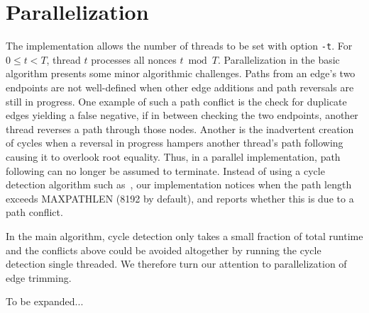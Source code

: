 \documentclass[11pt, oneside]{article}
\begin{document}
\section{Parallelization}
The implementation allows the number of threads to be set with option {\tt -t}.
For $0\leq t < T$, thread $t$ processes all nonces $t \bmod T$.
Parallelization in the basic algorithm presents some minor algorithmic challenges.
Paths from an edge's two endpoints
are not well-defined when other edge additions and path reversals are still in progress.
One example of such a path conflict is the check for duplicate edges yielding a false negative,
if in between checking the two endpoints, another thread reverses a path through those nodes.
Another is the inadvertent creation of cycles when a reversal in progress hampers another thread's
path following causing it to overlook root equality.
Thus, in a parallel implementation, path following can no longer be assumed to terminate.
Instead of using a cycle detection algorithm such as~\cite{1980-brent-cycles}, our implementation
notices when the path length exceeds MAXPATHLEN (8192 by default),
and reports whether this is due to a path conflict.

In the main algorithm, cycle detection only takes a small fraction of total runtime and
the conflicts above could be avoided altogether by running the cycle detection single threaded.
We therefore turn our attention to parallelization of edge trimming.

To be expanded...
\end{document}
